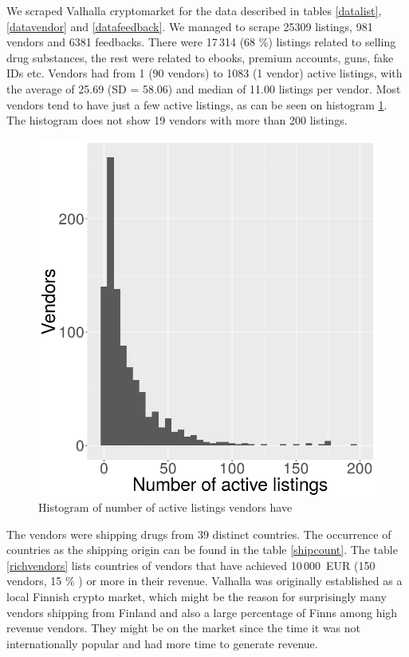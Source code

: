 \documentclass[
  digital, %
  table,   %
  lof,     %
  lot,     %
  oneside
]{fithesis3}
\begin{document}
We scraped Valhalla cryptomarket for the data described in tables \ref{datalist}, \ref{datavendor} and \ref{datafeedback}.
We managed to scrape 25309 listings, 981 vendors and 6381 feedbacks.
There were 17\,314 (68 \%) listings related to selling drug substances, the rest
were related to ebooks, premium accounts, guns, fake IDs etc.
Vendors had from 1 (90 vendors) to 1083 (1 vendor)
active listings, with the average of 25.69 (SD = 58.06)
and median of 11.00 listings per vendor.
Most vendors tend to have just a few active listings,
as can be seen on histogram \ref{listingsxsellers}.
The histogram does not show 19 vendors with more than 200 listings.

\begin{figure}[!htb]
    \centering
    \includegraphics[scale=0.6]{listingsxsellers}
    \centering
    \caption{Histogram of number of active listings vendors have}
    \label{listingsxsellers}
\end{figure}

The vendors were shipping drugs from 39 distinct countries.
The occurrence of countries as the shipping origin can be found in the table \ref{shipcount}.
The table \ref{richvendors} lists countries of vendors that have achieved 10\,000~EUR (150 vendors, 15 \% ) or more in their revenue.
Valhalla was originally established as a local Finnish crypto market,
which might be the reason for surprisingly many vendors shipping from Finland and also a large percentage
of Finns among high revenue vendors. They might be on the market since
the time it was not internationally popular and had more time to generate revenue.
\end{document}
